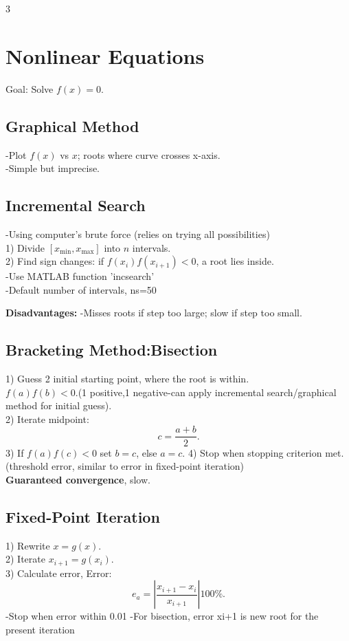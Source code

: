 \documentclass[9pt,a4paper]{article}
\begin{document}
\begin{multicols}{3}

\section{Nonlinear Equations}

Goal: Solve $f(x)=0$.

\subsection{Graphical Method}
-Plot $f(x)$ vs $x$; roots where curve crosses x-axis.\\
-Simple but imprecise.

\subsection{Incremental Search}
-Using computer's brute force (relies on trying all possibilities)\\
1) Divide $[x_{\min},x_{\max}]$ into $n$ intervals.\\
2) Find sign changes: if $f(x_i)f(x_{i+1})<0$, a root lies inside.\\
-Use MATLAB function 'incsearch'\\
-Default number of intervals, ns=50

\textbf{Disadvantages:}  
-Misses roots if step too large; slow if step too small.

\subsection{Bracketing Method:Bisection}
1) Guess 2 initial starting point, where the root is within.\\
$f(a)f(b)<0$.(1 positive,1 negative-can apply incremental search/graphical method for initial guess).\\  
2) Iterate midpoint:
\[c=\frac{a+b}{2}.\]
3) If $f(a)f(c)<0$ set $b=c$, else $a=c$.
4) Stop when stopping criterion met. (threshold error, similar to error in fixed-point iteration)\\
\textbf{Guaranteed convergence}, slow.

\subsection{Fixed-Point Iteration}
1) Rewrite $x=g(x)$.\\
2) Iterate $x_{i+1}=g(x_i)$.\\
3) Calculate error,
Error:
\[
e_a=\left|\frac{x_{i+1}-x_i}{x_{i+1}}\right|100\%.
\]
-Stop when error within 0.01
-For bisection, error xi+1 is new root for the present iteration


\end{multicols}
\end{document}
